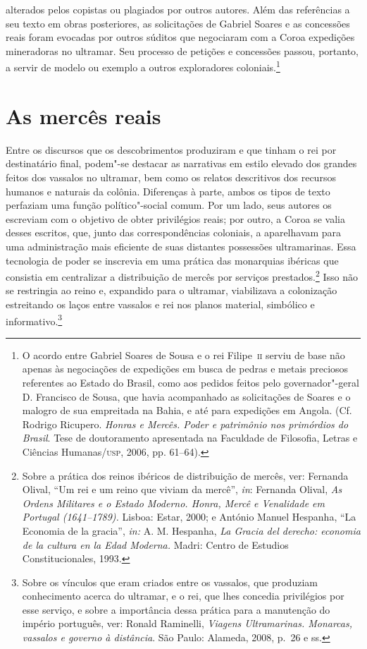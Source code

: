 alterados pelos copistas ou plagiados por outros autores. Além das
referências a seu texto em obras posteriores, as solicitações de
Gabriel Soares e as concessões reais foram evocadas por outros súditos
que negociaram com a Coroa expedições mineradoras no ultramar. Seu
processo de petições e concessões passou, portanto, a servir de modelo
ou exemplo a outros exploradores coloniais.\footnote{ O acordo entre
Gabriel Soares de Sousa e o rei Filipe~\textsc{ii} serviu de base não apenas
às negociações de expedições em busca de pedras e metais preciosos
referentes ao Estado do Brasil, como aos pedidos feitos pelo 
governador"-geral D. Francisco de Sousa, que havia acompanhado as
solicitações de Soares e o malogro de sua empreitada na Bahia, e até
para expedições em Angola. (Cf. Rodrigo Ricupero. \textit{Honras e Mercês.
Poder e patrimônio nos primórdios do Brasil}. Tese de doutoramento apresentada
na Faculdade de Filosofia, Letras e Ciências Humanas/\textsc{usp}, 2006, pp. 61--64).}

\section*{As mercês reais}

Entre os discursos que os descobrimentos produziram e que
tinham o rei por destinatário final, podem"-se destacar as narrativas em
estilo elevado dos grandes feitos dos vassalos no ultramar, bem como os
relatos descritivos dos recursos humanos e
naturais da colônia. Diferenças à parte, ambos os tipos de texto
perfaziam uma função político"-social comum. Por um lado, seus autores
os escreviam com o objetivo de obter privilégios reais; por outro, a
Coroa se valia desses escritos, que, junto das correspondências
coloniais, a aparelhavam para uma administração mais eficiente de suas
distantes possessões ultramarinas. Essa tecnologia de poder se
inscrevia em uma prática das monarquias ibéricas que consistia em
centralizar a distribuição de mercês por serviços prestados.\footnote{
Sobre a prática dos reinos ibéricos de distribuição de mercês, ver:
Fernanda Olival, “Um rei e um reino que viviam da mercê”, \textit{in}:
Fernanda Olival, \textit{As Ordens Militares e o Estado
Moderno. Honra, Mercê e Venalidade em Portugal (1641--1789).} Lisboa:
Estar, 2000; e António Manuel Hespanha, “La Economia de la gracia”,
\textit{in:} A. M. Hespanha, \textit{La Gracia del derecho: economia de
la cultura en la Edad Moderna.} Madri: Centro de Estudios
Constitucionales, 1993.} Isso não se restringia ao reino e, expandido
para o ultramar, viabilizava a colonização estreitando os laços entre
vassalos e rei nos planos material, simbólico e informativo.\footnote{Sobre os vínculos que eram criados entre os vassalos, que produziam conhecimento acerca do ultramar, e o rei, que
lhes concedia privilégios por esse serviço, e sobre a importância dessa prática para a manutenção do império
português, ver: Ronald Raminelli, \textit{Viagens Ultramarinas. Monarcas, vassalos e
governo à distância}. São Paulo: Alameda, 2008, p.~26 e ss.}

